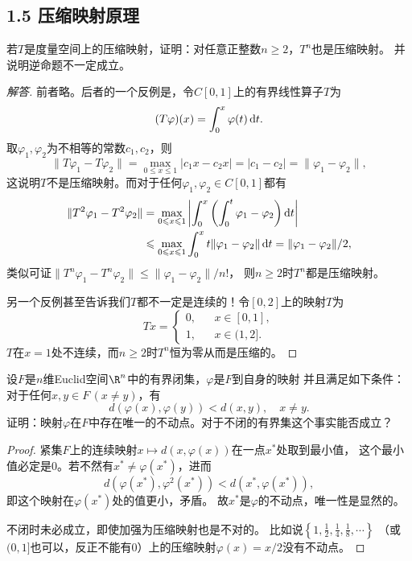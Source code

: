 \subsection{1.5 压缩映射原理}
\begin{1}
    若$T$是度量空间上的压缩映射，证明：对任意正整数$n\geqslant2$，$T^n$也是压缩映射。
    并说明逆命题不一定成立。
\end{1}
\begin{proof}[解答]
    前者略。后者的一个反例是，令$C[0,1]$上的有界线性算子$T$为
    \[(T\varphi)(x)=\int_0^x\varphi(t)\,{\rm d}t.\]
    取$\varphi_1,\varphi_2$为不相等的常数$c_1,c_2$，则
    \[\|T\varphi_1-T\varphi_2\|=\max_{0 \leqslant x \leqslant 1}|c_1x-c_2x|
    =|c_1-c_2|=\|\varphi_1-\varphi_2\|,\]
    这说明$T$不是压缩映射。而对于任何$\varphi_1,\varphi_2 \in C[0,1]$都有
    \begin{align}
        \|T^2\varphi_1-T^2\varphi_2\|&=\max_{0 \leqslant x \leqslant 1}\left|\int_0^x\left(\int_0^t\varphi_1-\varphi_2\right){\rm d}t\right|\\
        &\leqslant\max_{0 \leqslant x \leqslant 1}\int_0^xt\|\varphi_1-\varphi_2\|\,{\rm d}t=\|\varphi_1-\varphi_2\|/2,
    \end{align}
    类似可证$\|T^n\varphi_1-T^n\varphi_2\|\leqslant\|\varphi_1-\varphi_2\|/n!$，
    则$n\geqslant2$时$T^n$都是压缩映射。

    另一个反例甚至告诉我们$T$都不一定是连续的！令$[0,2]$上的映射$T$为
    \[Tx=\begin{cases}0,& &x\in[0,1],\\1,& &x\in(1,2].\end{cases}\]
    $T$在$x=1$处不连续，而$n\geqslant2$时$T^n$恒为零从而是压缩的。
\end{proof}

\begin{6}
    设$F$是$n$维Euclid空间$\R^n$中的有界闭集，$\varphi$是$F$到自身的映射
    并且满足如下条件：对于任何$x,y \in F\,(x \ne y)$，有
    \[d(\varphi(x),\varphi(y))<d(x,y), \quad x \ne y.\]
    证明：映射$\varphi$在$F$中存在唯一的不动点。对于不闭的有界集这个事实能否成立？
\end{6}
\begin{proof}
    紧集$F$上的连续映射$x \mapsto d(x,\varphi(x))$在一点$x^*$处取到最小值，
    这个最小值必定是$0$。若不然有$x^*\ne\varphi(x^*)$，进而
    \[d(\varphi(x^*),\varphi^2(x^*))<d(x^*,\varphi(x^*)),\]
    即这个映射在$\varphi(x^*)$处的值更小，矛盾。
    故$x^*$是$\varphi$的不动点，唯一性是显然的。

    不闭时未必成立，即使加强为压缩映射也是不对的。
    比如说$\left\{1,\frac{1}{2},\frac{1}{4},\frac{1}{8},\cdots\right\}$
    （或$(0,1]$也可以，反正不能有$0$）上的压缩映射$\varphi(x)=x/2$没有不动点。
\end{proof}

